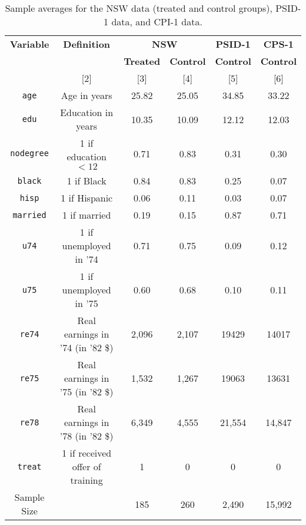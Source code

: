 \begin{table}[ht!]
    \label{tab:descriptive-stats}
    \centering
    \begin{tabular}{cccccc}
    \hline
    \textbf{Variable} & \textbf{Definition} & \multicolumn{2}{c}{\textbf{NSW}}    & \textbf{PSID-1}  & \textbf{CPS-1}   \\ \cline{3-6} 
    \textbf{}         & \textbf{}           & \textbf{Treated} & \textbf{Control} & \textbf{Control} & \textbf{Control} \\ 
    \hline
    [1] & [2] & [3] & [4] & [5] & [6] \\ \hline
    \texttt{age}      & Age in years                     & 25.82 & 25.05 & 34.85 & 33.22  \\
    \texttt{edu}      & Education in years               & 10.35 & 10.09 & 12.12 & 12.03  \\
    \texttt{nodegree} & 1 if education $<12$             & 0.71  & 0.83  & 0.31  & 0.30   \\
    \texttt{black}    & 1 if Black                       & 0.84  & 0.83  & 0.25  & 0.07   \\
    \texttt{hisp}     & 1 if Hispanic                    & 0.06  & 0.11  & 0.03  & 0.07   \\
    \texttt{married}  & 1 if married                     & 0.19  & 0.15  & 0.87  & 0.71   \\
    \texttt{u74}      & 1 if unemployed in '74           & 0.71  & 0.75  & 0.09  & 0.12   \\
    \texttt{u75}      & 1 if unemployed in '75           & 0.60  & 0.68  & 0.10  & 0.11   \\
    \texttt{re74}     & Real earnings in '74 (in '82 \$) & 2,096 & 2,107 & 19429 & 14017  \\
    \texttt{re75}     & Real earnings in '75 (in '82 \$) & 1,532 & 1,267 & 19063 & 13631  \\
    \hline
    \texttt{re78}     & Real earnings in '78 (in '82 \$) & 6,349 & 4,555 & 21,554   & 14,847       \\
    \texttt{treat}    & 1 if received offer of training  & 1     & 0     & 0      & 0       \\ \hline
    Sample Size                        &                                  & 185   & 260   & 2,490 & 15,992 \\ \hline
    \end{tabular}
    \caption{Sample averages for the NSW data (treated and control groups), PSID-1 data, and CPI-1 data.}
    \end{table}
